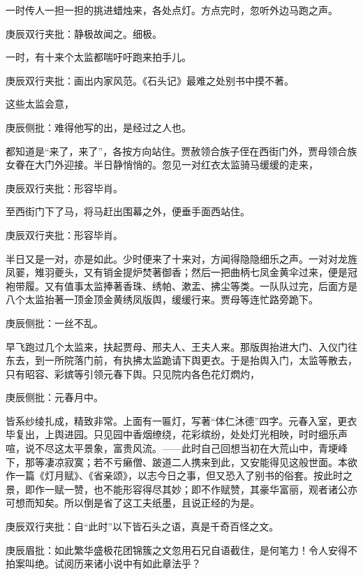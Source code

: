 \begin{parag}
    一时传人一担一担的挑进蜡烛来，各处点灯。方点完时，忽听外边马跑之声。\begin{note}庚辰双行夹批：静极故闻之。细极。\end{note} 一时，有十来个太监都喘吁吁跑来拍手儿。\begin{note}庚辰双行夹批：画出内家风范。《石头记》最难之处别书中摸不著。\end{note}这些太监会意，\begin{note}庚辰侧批：难得他写的出，是经过之人也。\end{note}都知道是“来了，来了”，各按方向站住。贾赦领合族子侄在西街门外，贾母领合族女眷在大门外迎接。半日静悄悄的。忽见一对红衣太监骑马缓缓的走来，\begin{note}庚辰双行夹批：形容毕肖。\end{note}至西街门下了马，将马赶出围幕之外，便垂手面西站住。\begin{note}庚辰双行夹批：形容毕肖。\end{note}半日又是一对，亦是如此。少时便来了十来对，方闻得隐隐细乐之声。一对对龙旌凤翣，雉羽夔头，又有销金提炉焚著御香；然后一把曲柄七凤金黄伞过来，便是冠袍带履。又有值事太监捧著香珠、绣帕、漱盂、拂尘等类。一队队过完，后面方是八个太监抬著一顶金顶金黄绣凤版舆，缓缓行来。贾母等连忙路旁跪下。 \begin{note}庚辰侧批：一丝不乱。\end{note}早飞跑过几个太监来，扶起贾母、邢夫人、王夫人来。那版舆抬进大门、入仪门往东去，到一所院落门前，有执拂太监跪请下舆更衣。于是抬舆入门，太监等散去，只有昭容、彩嫔等引领元春下舆。只见院内各色花灯熌灼，\begin{note}庚辰侧批：元春月中。 \end{note}皆系纱绫扎成，精致非常。上面有一匾灯，写著“体仁沐德”四字。元春入室，更衣毕复出，上舆进园。只见园中香烟缭绕，花彩缤纷，处处灯光相映，时时细乐声喧，说不尽这太平景象，富贵风流。——此时自己回想当初在大荒山中，青埂峰下，那等凄凉寂寞；若不亏癞僧、跛道二人携来到此，又安能得见这般世面。本欲作一篇《灯月赋》、《省亲颂》，以志今日之事，但又恐入了别书的俗套。按此时之景，即作一赋一赞，也不能形容得尽其妙；即不作赋赞，其豪华富丽，观者诸公亦可想而知矣。所以倒是省了这工夫纸墨，且说正经的为是。\begin{note}庚辰双行夹批：自“此时”以下皆石头之语，真是千奇百怪之文。\end{note}\begin{note}庚辰眉批：如此繁华盛极花团锦簇之文忽用石兄自语截住，是何笔力！令人安得不拍案叫绝。试阅历来诸小说中有如此章法乎？\end{note}
\end{parag}


